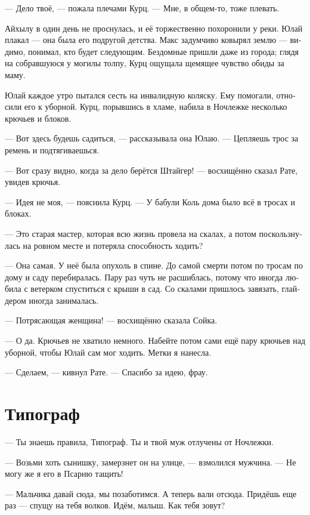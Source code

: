 \documentclass[a4paper,12pt,fleqn]{book}\usepackage{polyglossia}\setdefaultlanguage[babelshorthands=true]{russian}\setotherlanguage{english}\defaultfontfeatures{Ligatures=TeX,Mapping=tex-text}\usepackage{xcolor}\newcommand{\ml}[3]{#2}
\newcommand{\textspace}{\vspace{1em}{\centering\Large\bfseries<...>\par}\vspace{1em}}
\begin{document}
\ml{$0$}
{--- Дело твоё, --- пожала плечами Курц.}
{``Suit yourself,'' Kurz shrugged.}
\ml{$0$}
{--- Мне, в общем-то, тоже плевать.}
{``As a matter of fact, I don't give a fuck either.''}

Айхылу в один день не проснулась, и её торжественно похоронили у реки.
Юлай плакал --- она была его подругой детства.
Макс задумчиво ковырял землю --- видимо, понимал, кто будет следующим.
Бездомные пришли даже из города;
глядя на собравшуюся у могилы толпу, Курц ощущала щемящее чувство обиды за маму.

\textspace

Юлай каждое утро пытался сесть на инвалидную коляску.
Ему помогали, относили его к уборной.
Курц, порывшись в хламе, набила в Ночлежке несколько крючьев и блоков.

--- Вот здесь будешь садиться, --- рассказывала она Юлаю.
--- Цепляешь трос за ремень и подтягиваешься.

--- Вот сразу видно, когда за дело берётся Штайгер! --- восхищённо сказал Рате, увидев крючья.

--- Идея не моя, --- пояснила Курц.
--- У бабули Коль дома было всё в тросах и блоках.

--- Это старая мастер, которая всю жизнь провела на скалах, а потом поскользнулась на ровном месте и потеряла способность ходить?

--- Она самая.
У неё была опухоль в спине.
До самой смерти потом по тросам по дому и саду перебиралась.
Пару раз чуть не расшиблась, потому что иногда любила с ветерком спуститься с крыши в сад.
Со скалами пришлось завязать, глайдером иногда занималась.

--- Потрясающая женщина! --- восхищённо сказала Сойка.

--- О да.
Крючьев не хватило немного.
Набейте потом сами ещё пару крючьев над уборной, чтобы Юлай сам мог ходить.
Метки я нанесла.

--- Сделаем, --- кивнул Рате.
--- Спасибо за идею, фрау.

\section{Типограф}

--- Ты знаешь правила, Типограф.
Ты и твой муж отлучены от Ночлежки.

--- Возьми хоть сынишку, замерзнет он на улице, --- взмолился мужчина.
--- Не могу же я его в Псарню тащить!

--- Мальчика давай сюда, мы позаботимся.
А теперь вали отсюда.
Придёшь еще раз --- спущу на тебя волков.
Идём, малыш.
Как тебя зовут?
\end{document}
